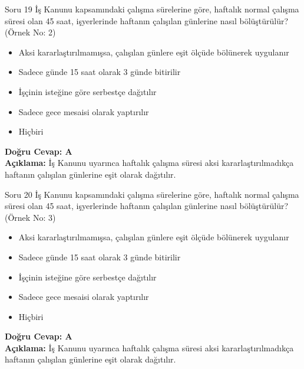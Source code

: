 \documentclass[12pt,a4paper]{article}
\begin{document}
\begin{testcard}{Soru 19}
    İş Kanunu kapsamındaki çalışma sürelerine göre, haftalık normal çalışma süresi olan 45 saat, işyerlerinde haftanın çalışılan günlerine nasıl bölüştürülür? (Örnek No: 2)
    \begin{itemize}
        \item[A)] Aksi kararlaştırılmamışsa, çalışılan günlere eşit ölçüde bölünerek uygulanır
        \item[B)] Sadece günde 15 saat olarak 3 günde bitirilir
        \item[C)] İşçinin isteğine göre serbestçe dağıtılır
        \item[D)] Sadece gece mesaisi olarak yaptırılır
        \item[E)] Hiçbiri
    \end{itemize}
    \tcblower
    \textbf{Doğru Cevap: A} \\
    \textbf{Açıklama:} İş Kanunu uyarınca haftalık çalışma süresi aksi kararlaştırılmadıkça haftanın çalışılan günlerine eşit olarak dağıtılır.
\end{testcard}

\begin{testcard}{Soru 20}
    İş Kanunu kapsamındaki çalışma sürelerine göre, haftalık normal çalışma süresi olan 45 saat, işyerlerinde haftanın çalışılan günlerine nasıl bölüştürülür? (Örnek No: 3)
    \begin{itemize}
        \item[A)] Aksi kararlaştırılmamışsa, çalışılan günlere eşit ölçüde bölünerek uygulanır
        \item[B)] Sadece günde 15 saat olarak 3 günde bitirilir
        \item[C)] İşçinin isteğine göre serbestçe dağıtılır
        \item[D)] Sadece gece mesaisi olarak yaptırılır
        \item[E)] Hiçbiri
    \end{itemize}
    \tcblower
    \textbf{Doğru Cevap: A} \\
    \textbf{Açıklama:} İş Kanunu uyarınca haftalık çalışma süresi aksi kararlaştırılmadıkça haftanın çalışılan günlerine eşit olarak dağıtılır.
\end{testcard}
\end{document}
